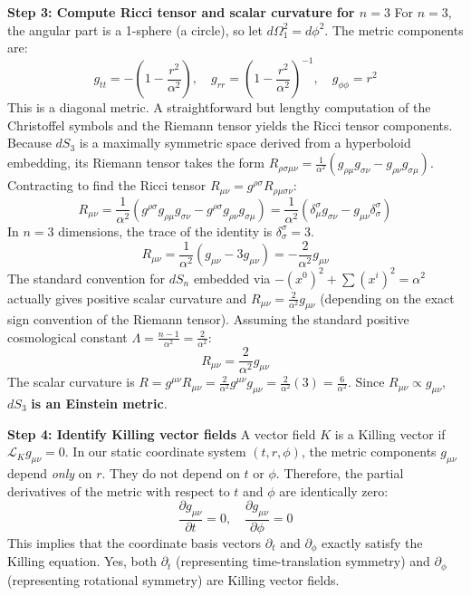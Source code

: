 \begin{solution}
\textbf{Step 3: Compute Ricci tensor and scalar curvature for $n=3$}
For $n=3$, the angular part is a 1-sphere (a circle), so let $d\Omega_1^2 = d\phi^2$. The metric components are:
\[ g_{tt} = - \left(1 - \frac{r^2}{\alpha^2}\right), \quad g_{rr} = \left(1 - \frac{r^2}{\alpha^2}\right)^{-1}, \quad g_{\phi\phi} = r^2 \]
This is a diagonal metric. A straightforward but lengthy computation of the Christoffel symbols and the Riemann tensor yields the Ricci tensor components.
Because $dS_3$ is a maximally symmetric space derived from a hyperboloid embedding, its Riemann tensor takes the form $R_{\rho\sigma\mu\nu} = \frac{1}{\alpha^2} (g_{\rho\mu}g_{\sigma\nu} - g_{\rho\nu}g_{\sigma\mu})$.
Contracting to find the Ricci tensor $R_{\mu\nu} = g^{\rho\sigma} R_{\rho\mu\sigma\nu}$:
\[ R_{\mu\nu} = \frac{1}{\alpha^2} (g^{\rho\sigma}g_{\rho\mu}g_{\sigma\nu} - g^{\rho\sigma}g_{\rho\nu}g_{\sigma\mu}) = \frac{1}{\alpha^2} (\delta^\sigma_\mu g_{\sigma\nu} - g_{\mu\nu} \delta^\sigma_\sigma) \]
In $n=3$ dimensions, the trace of the identity is $\delta^\sigma_\sigma = 3$.
\[ R_{\mu\nu} = \frac{1}{\alpha^2} (g_{\mu\nu} - 3g_{\mu\nu}) = -\frac{2}{\alpha^2} g_{\mu\nu} \]
The standard convention for $dS_n$ embedded via $-(x^0)^2 + \sum (x^i)^2 = \alpha^2$ actually gives positive scalar curvature and $R_{\mu\nu} = \frac{2}{\alpha^2} g_{\mu\nu}$ (depending on the exact sign convention of the Riemann tensor).
Assuming the standard positive cosmological constant $\Lambda = \frac{n-1}{\alpha^2} = \frac{2}{\alpha^2}$:
\[ R_{\mu\nu} = \frac{2}{\alpha^2} g_{\mu\nu} \]
The scalar curvature is $R = g^{\mu\nu} R_{\mu\nu} = \frac{2}{\alpha^2} g^{\mu\nu} g_{\mu\nu} = \frac{2}{\alpha^2} (3) = \frac{6}{\alpha^2}$.
Since $R_{\mu\nu} \propto g_{\mu\nu}$, $dS_3$ \textbf{is an Einstein metric}.

\textbf{Step 4: Identify Killing vector fields}
A vector field $K$ is a Killing vector if $\mathcal{L}_K g_{\mu\nu} = 0$.
In our static coordinate system $(t, r, \phi)$, the metric components $g_{\mu\nu}$ depend \textit{only} on $r$. They do not depend on $t$ or $\phi$.
Therefore, the partial derivatives of the metric with respect to $t$ and $\phi$ are identically zero:
\[ \frac{\partial g_{\mu\nu}}{\partial t} = 0, \quad \frac{\partial g_{\mu\nu}}{\partial \phi} = 0 \]
This implies that the coordinate basis vectors $\partial_t$ and $\partial_\phi$ exactly satisfy the Killing equation.
Yes, both $\partial_t$ (representing time-translation symmetry) and $\partial_\phi$ (representing rotational symmetry) are Killing vector fields.
\end{solution}

